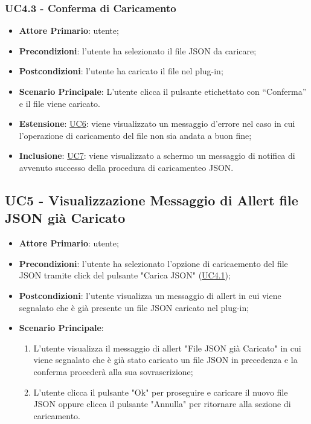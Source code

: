 		\subsubsection{UC4.3 - Conferma di Caricamento}
		\begin{itemize}
			\item\textbf{Attore Primario}: utente;
			\item\textbf{Precondizioni}: l’utente ha selezionato il file JSON da caricare;
			\item\textbf{Postcondizioni}: l’utente ha caricato il file nel plug-in; 
			\item\textbf{Scenario Principale}: L’utente clicca il pulsante etichettato con “Conferma” e il file viene caricato.
			\item\textbf{Estensione}: \hyperref[par:UC6]{UC6}: viene visualizzato un messaggio d’errore nel caso in cui l’operazione di caricamento del file non sia andata a buon fine;				
			\item\textbf{Inclusione}: \hyperref[par:UC7]{UC7}: viene visualizzato a schermo un messaggio di notifica di avvenuto successo della procedura di caricamenteo JSON.	
		\end{itemize}

	
	\label{par:UC5}
	\subsection{UC5 - Visualizzazione Messaggio di Allert file JSON già Caricato}
		\begin{itemize}
			\item\textbf{Attore Primario}: utente;
			\item\textbf{Precondizioni}: l’utente ha selezionato l'opzione di caricaemento del file JSON tramite click del pulsante "Carica JSON" (\hyperref[par:UC4.1]{UC4.1});
			\item\textbf{Postcondizioni}: l’utente visualizza un messaggio di allert in cui viene segnalato che è già presente un file JSON caricato nel plug-in; 
			\item\textbf{Scenario Principale}: 
				\begin{enumerate} 
					\item L’utente visualizza il messaggio di allert "File JSON già Caricato" in cui viene segnalato che è già stato caricato un file JSON in precedenza e la conferma procederà alla sua sovrascrizione;
					\item L'utente clicca il pulsante "Ok" per proseguire e caricare il nuovo file JSON oppure clicca il pulsante "Annulla" per ritornare alla sezione di caricamento.
				\end{enumerate}
		\end{itemize}	

